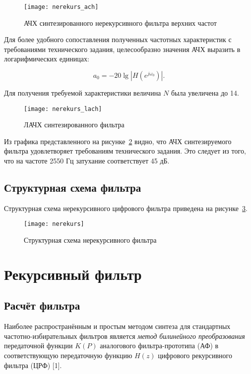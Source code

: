 \begin{figure}[h!]
  \label{f:1}
  \texttt{[image: nerekurs\_ach]}
  \caption{АЧХ синтезированного нерекурсивного фильтра верхних частот}
\end{figure}

Для более удобного сопоставления полученных частотных характеристик с
требованиями технического задания, целесообразно значения АЧХ выразить
в логарифмических единицах:

\begin{equation*}
  a_0 = -20 \lg\left|H(e^{j \omega_0})\right|.
\end{equation*}

Для получения требуемой характеристики величина $N$ была увеличена до 14.

\begin{figure}[h!]
  \label{f:2}
  \texttt{[image: nerekurs\_lach]}
  \caption{ЛАЧХ синтезированного фильтра}
\end{figure}


Из графика представленного на рисунке~\ref{f:2} видно, что АЧХ синтезируемого
фильтра удовлетворяет требованиям технического задания. Это следует из
того, что на частоте 2550 Гц затухание соответствует 45 дБ.

\subsection{Структурная схема фильтра}

Структурная схема нерекурсивного цифрового фильтра приведена на 
рисунке~\ref{nerekurs_dia}.

\begin{figure}[h!]
  \label{nerekurs_dia}
  \texttt{[image: nerekurs]}
  \caption{Структурная схема нерекурсивного фильтра}
\end{figure}

\newpage

\section{Рекурсивный фильтр}
\label{sec:rekurs}

\subsection{Расчёт фильтра}

\point Наиболее распространённым и простым методом синтеза для
стандартных частотно-избирательных фильтров является \textit{метод билинейного
преобразования} передаточной функции $K(P)$ аналогового фильтра-прототипа
(АФ) в соответствующую передаточную функцию $H(z)$ цифрового
рекурсивного фильтра (ЦРФ) [1].

